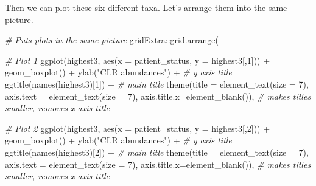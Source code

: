 \documentclass[
  oneside]{book}
\newenvironment{Shaded}{\begin{snugshade}}{\end{snugshade}}
\newcommand{\AttributeTok}[1]{\textcolor[rgb]{0.77,0.63,0.00}{#1}}
\newcommand{\CommentTok}[1]{\textcolor[rgb]{0.56,0.35,0.01}{\textit{#1}}}
\newcommand{\DecValTok}[1]{\textcolor[rgb]{0.00,0.00,0.81}{#1}}
\newcommand{\FunctionTok}[1]{\textcolor[rgb]{0.00,0.00,0.00}{#1}}
\newcommand{\NormalTok}[1]{#1}
\newcommand{\SpecialCharTok}[1]{\textcolor[rgb]{0.00,0.00,0.00}{#1}}
\newcommand{\StringTok}[1]{\textcolor[rgb]{0.31,0.60,0.02}{#1}}
\begin{document}
Then we can plot these six different taxa. Let's arrange them into the same picture.

\begin{Shaded}
\begin{Highlighting}[]
\CommentTok{\# Puts plots in the same picture}
\NormalTok{gridExtra}\SpecialCharTok{::}\FunctionTok{grid.arrange}\NormalTok{(}
  
  \CommentTok{\# Plot 1}
  \FunctionTok{ggplot}\NormalTok{(highest3, }\FunctionTok{aes}\NormalTok{(}\AttributeTok{x =}\NormalTok{ patient\_status, }\AttributeTok{y =}\NormalTok{ highest3[,}\DecValTok{1}\NormalTok{])) }\SpecialCharTok{+} 
    \FunctionTok{geom\_boxplot}\NormalTok{() }\SpecialCharTok{+} 
    \FunctionTok{ylab}\NormalTok{(}\StringTok{"CLR abundances"}\NormalTok{) }\SpecialCharTok{+} \CommentTok{\# y axis title}
    \FunctionTok{ggtitle}\NormalTok{(}\FunctionTok{names}\NormalTok{(highest3)[}\DecValTok{1}\NormalTok{]) }\SpecialCharTok{+} \CommentTok{\# main title}
    \FunctionTok{theme}\NormalTok{(}\AttributeTok{title =} \FunctionTok{element\_text}\NormalTok{(}\AttributeTok{size =} \DecValTok{7}\NormalTok{),}
          \AttributeTok{axis.text =} \FunctionTok{element\_text}\NormalTok{(}\AttributeTok{size =} \DecValTok{7}\NormalTok{),}
          \AttributeTok{axis.title.x=}\FunctionTok{element\_blank}\NormalTok{()), }\CommentTok{\# makes titles smaller, removes x axis title}
  
  \CommentTok{\# Plot 2}
  \FunctionTok{ggplot}\NormalTok{(highest3, }\FunctionTok{aes}\NormalTok{(}\AttributeTok{x =}\NormalTok{ patient\_status, }\AttributeTok{y =}\NormalTok{ highest3[,}\DecValTok{2}\NormalTok{])) }\SpecialCharTok{+} 
    \FunctionTok{geom\_boxplot}\NormalTok{() }\SpecialCharTok{+} 
    \FunctionTok{ylab}\NormalTok{(}\StringTok{"CLR abundances"}\NormalTok{) }\SpecialCharTok{+} \CommentTok{\# y axis title}
    \FunctionTok{ggtitle}\NormalTok{(}\FunctionTok{names}\NormalTok{(highest3)[}\DecValTok{2}\NormalTok{]) }\SpecialCharTok{+} \CommentTok{\# main title}
    \FunctionTok{theme}\NormalTok{(}\AttributeTok{title =} \FunctionTok{element\_text}\NormalTok{(}\AttributeTok{size =} \DecValTok{7}\NormalTok{),}
          \AttributeTok{axis.text =} \FunctionTok{element\_text}\NormalTok{(}\AttributeTok{size =} \DecValTok{7}\NormalTok{),}
          \AttributeTok{axis.title.x=}\FunctionTok{element\_blank}\NormalTok{()), }\CommentTok{\# makes titles smaller, removes x axis title}
  

\end{Highlighting}
\end{Shaded}
\end{document}
